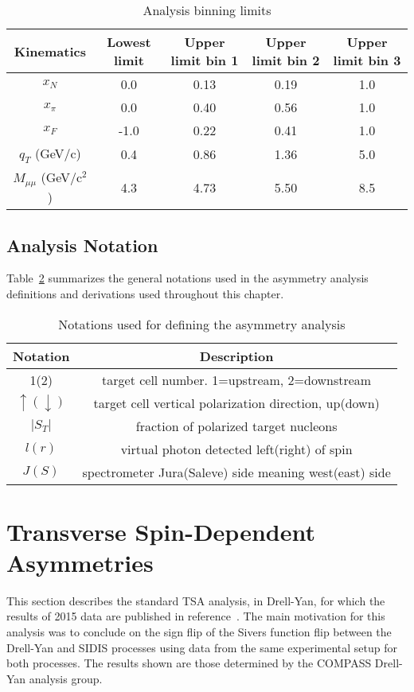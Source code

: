 \begin{table}[h!t]
  \centering
  \begin{tabular}{ |c|c|c|c|c| }
    \hline \textbf{Kinematics}& \textbf{Lowest limit}& \textbf{Upper limit bin
      1}& \textbf{Upper limit bin 2}& \textbf{Upper limit bin 3}\\ \hline
    
    $x_N$& 0.0& 0.13& 0.19& 1.0\\ \hline $x_{\pi}$& 0.0& 0.40& 0.56&
    1.0\\ \hline $x_F$& -1.0& 0.22& 0.41& 1.0\\ \hline $q_T$ (GeV/c)& 0.4& 0.86&
    1.36& 5.0\\ \hline $M_{\mu\mu}$ (GeV/c$^2$)& 4.3& 4.73& 5.50& 8.5 \\ \hline
    
  \end{tabular}
  \caption{Analysis binning limits}
  \label{tab::binning}
\end{table}

\subsection{Analysis Notation}
Table~\ref{tab::ANnotations} summarizes the general notations used in the
asymmetry analysis definitions and derivations used throughout this chapter.

\begin{table}[h!t]
  \centering
  \caption{Notations used for defining the asymmetry analysis}
  \label{tab::ANnotations}
  \begin{tabular}{ |c|c| }
    
    \hline \textbf{Notation}& \textbf{Description}
    \\ \hline 1(2)& target cell
    number. 1=upstream, 2=downstream \\ \hline
    $\uparrow(\downarrow)$ & target
    cell vertical polarization direction, up(down) \\ \hline
    $|S_T|$& fraction of
    polarized target nucleons \\ \hline
    $l(r)$ & virtual photon detected left(right) of spin \\ \hline
    $J(S)$ & spectrometer Jura(Saleve) side meaning west(east) side
    \\ \hline
    
  \end{tabular}
\end{table}

\section{Transverse Spin-Dependent Asymmetries} \label{sec::standTSA}
This section describes the standard TSA analysis, in Drell-Yan, for which the
results of 2015 data are published in reference~\cite{compassDYpaper}.  The main
motivation for this analysis was to conclude on the sign flip of the Sivers
function flip between the Drell-Yan and SIDIS processes using data from the same
experimental setup for both processes.  The results shown are those determined
by the COMPASS Drell-Yan analysis group.

